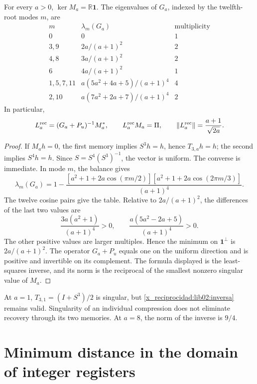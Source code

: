 \begin{theorem}
\label{x_reciprocidad:lib02:inversa-memorias}
For every \(a>0\), \(\ker M_a=\mathbb R\mathbf1\). The eigenvalues of \(G_a\), indexed by the twelfth-root modes \(m\), are
\[
\begin{array}{c|c|c}
 m&\lambda_m(G_a)&\text{multiplicity}\\\hline
 0&0&1\\
 3,9&2a/(a+1)^2&2\\
 4,8&3a/(a+1)^2&2\\
 6&4a/(a+1)^2&1\\
 1,5,7,11&a(5a^2+4a+5)/(a+1)^4&4\\
 2,10&a(7a^2+2a+7)/(a+1)^4&2
\end{array}
\]
In particular,
\begin{equation}
 L_a^{\rm rec}=(G_a+P_u)^{-1}M_a^*,\qquad
 L_a^{\rm rec}M_a=\Pi,\qquad
 \|L_a^{\rm rec}\|=\frac{a+1}{\sqrt{2a}}.
 \label{x_reciprocidad:lib02:inversa}
\end{equation}
\end{theorem}
\begin{proof}
If \(M_ah=0\), the first memory implies \(S^3h=h\), hence \(T_{3,a}h=h\); the second implies \(S^4h=h\). Since \(S=S^4(S^3)^{-1}\), the vector is uniform. The converse is immediate. In mode \(m\), the balance gives
\[
 \lambda_m(G_a)=1-
 \frac{[a^2+1+2a\cos(\pi m/2)]
 [a^2+1+2a\cos(2\pi m/3)]}{(a+1)^4}.
\]
The twelve cosine pairs give the table. Relative to \(2a/(a+1)^2\), the differences of the last two values are
\[
 \frac{3a(a^2+1)}{(a+1)^4}>0,\qquad
 \frac{a(5a^2-2a+5)}{(a+1)^4}>0.
\]
The other positive values are larger multiples. Hence the minimum on \(\mathbf1^\perp\) is \(2a/(a+1)^2\). The operator \(G_a+P_u\) equals one on the uniform direction and is positive and invertible on its complement. The formula displayed is the least-squares inverse, and its norm is the reciprocal of the smallest nonzero singular value of \(M_a\).
\end{proof}

At \(a=1\), \(T_{3,1}=(I+S^3)/2\) is singular, but \eqref{x_reciprocidad:lib02:inversa} remains valid. Singularity of an individual compression does not eliminate recovery through its two memories. At \(a=8\), the norm of the inverse is \(9/4\).

\section{Minimum distance in the domain of integer registers}
\label{x_reciprocidad:lib02:redes}

